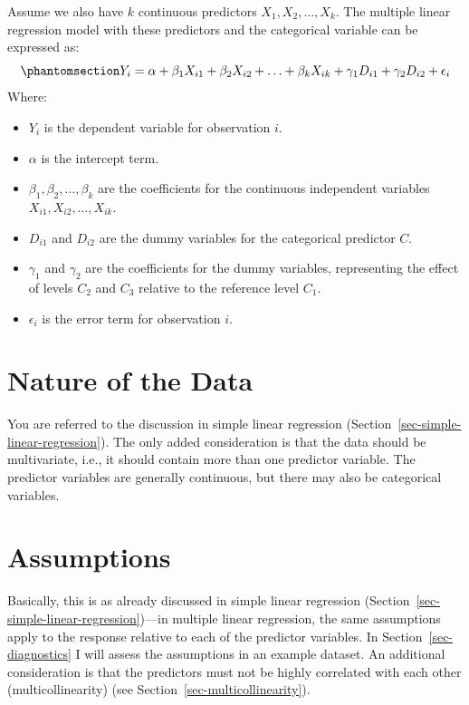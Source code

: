 \documentclass[
  letterpaper,
]{book}
\providecommand{\tightlist}{%
  \setlength{\itemsep}{0pt}\setlength{\parskip}{0pt}}\usepackage{longtable,booktabs,array}
\begin{document}
Assume we also have \(k\) continuous predictors
\(X_{1}, X_{2}, \ldots, X_{k}\). The multiple linear regression model
with these predictors and the categorical variable can be expressed as:
\begin{equation}\phantomsection\label{eq-mlr2}{Y_i = \alpha + \beta_1 X_{i1} + \beta_2 X_{i2} + \ldots + \beta_k X_{ik} + \gamma_1 D_{i1} + \gamma_2 D_{i2} + \epsilon_i}\end{equation}
Where:

\begin{itemize}
\tightlist
\item
  \(Y_i\) is the dependent variable for observation \(i\).
\item
  \(\alpha\) is the intercept term.
\item
  \(\beta_1, \beta_2, \ldots, \beta_k\) are the coefficients for the
  continuous independent variables \(X_{i1}, X_{i2}, \ldots, X_{ik}\).
\item
  \(D_{i1}\) and \(D_{i2}\) are the dummy variables for the categorical
  predictor \(C\).
\item
  \(\gamma_1\) and \(\gamma_2\) are the coefficients for the dummy
  variables, representing the effect of levels \(C_2\) and \(C_3\)
  relative to the reference level \(C_1\).
\item
  \(\epsilon_i\) is the error term for observation \(i\).
\end{itemize}

\section{Nature of the Data}\label{nature-of-the-data-1}

You are referred to the discussion in simple linear regression
(Section~\ref{sec-simple-linear-regression}). The only added
consideration is that the data should be multivariate, i.e., it should
contain more than one predictor variable. The predictor variables are
generally continuous, but there may also be categorical variables.

\section{Assumptions}\label{assumptions}

Basically, this is as already discussed in simple linear regression
(Section~\ref{sec-simple-linear-regression})---in multiple linear
regression, the same assumptions apply to the response relative to each
of the predictor variables. In Section~\ref{sec-diagnostics} I will
assess the assumptions in an example dataset. An additional
consideration is that the predictors must not be highly correlated with
each other (multicollinearity) (see
Section~\ref{sec-multicollinearity}).
\end{document}
